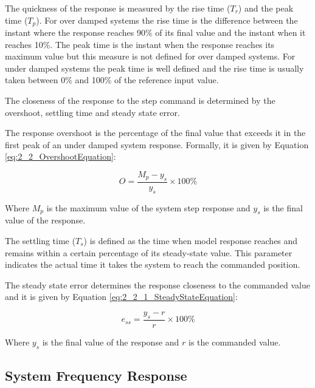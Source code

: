The quickness of the response is measured by the rise time ($T_r$) and the peak time ($T_p$). For over damped systems the rise time is the difference between the instant where the response reaches 90\% of its final value and the instant when it reaches 10\%. The peak time is the instant when the response reaches its maximum value but this measure is not defined for over damped systems. For under damped systems the peak time is well defined and the rise time is usually taken between 0\% and 100\% of the reference input value.

The closeness of the response to the step command is determined by the overshoot, settling time and steady state error.

The response overshoot is the percentage of the final value that exceeds it in the first peak of an under damped system response. Formally, it is given by Equation \ref{eq:2_2_OvershootEquation}:

\begin{equation}
\label{eq:2_2_OvershootEquation}
O = \frac{M_p - y_s}{y_s} \times 100\%
\end{equation}

Where $M_p$ is the maximum value of the system step response and $y_s$ is the final value of the response. 

The settling time ($T_s$) is defined as the time when model response reaches and remains within a certain percentage of its steady-state value. This parameter indicates the actual time it takes the system to reach the commanded position.

The steady state error determines the response closeness to the commanded value and it is given by Equation \ref{eq:2_2_1_SteadyStateEquation}:

\begin{equation}
\label{eq:2_2_1_SteadyStateEquation}
e_{ss} = \frac{y_s - r}{r} \times 100\%
\end{equation}

Where $y_s$ is the final value of the response and $r$ is the commanded value.


\subsection{System Frequency Response}

